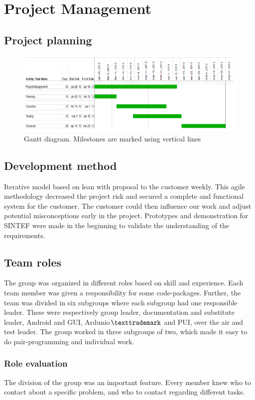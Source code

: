 \chapter{Project Management}

\section{Project planning}
\begin{figure}[H]
\includegraphics[scale=0.8]{images/gantt-diagram.png}
\caption{Gantt diagram. Milestones are marked using vertical lines}
\end{figure}

\section{Development method}
Iterative model based on lean with proposal to the customer weekly. This agile methodology decreased the project risk and secured a complete and functional system for the customer. The customer could then influence our work and adjust potential misconceptions early in the project. Prototypes and demonstration for SINTEF were made in the beginning to validate the understanding of the requirements.

\section{Team roles}
The group was organized in different roles based on skill and experience. Each team member was given a responsibility for some code-packages. Further, the team was divided in six subgroups where each subgroup had one responsible leader. These were respectively group leader, documentation and substitute leader, Android and GUI, Ardunio$\texttrademark$ and PUI, over the air and test leader. The group worked in three subgroups of two, which made it easy to do pair-programming and individual work.

\subsection{Role evaluation}
The division of the group was an important feature. Every member knew who to contact about a specific problem, and who to contact regarding different tasks.\\

